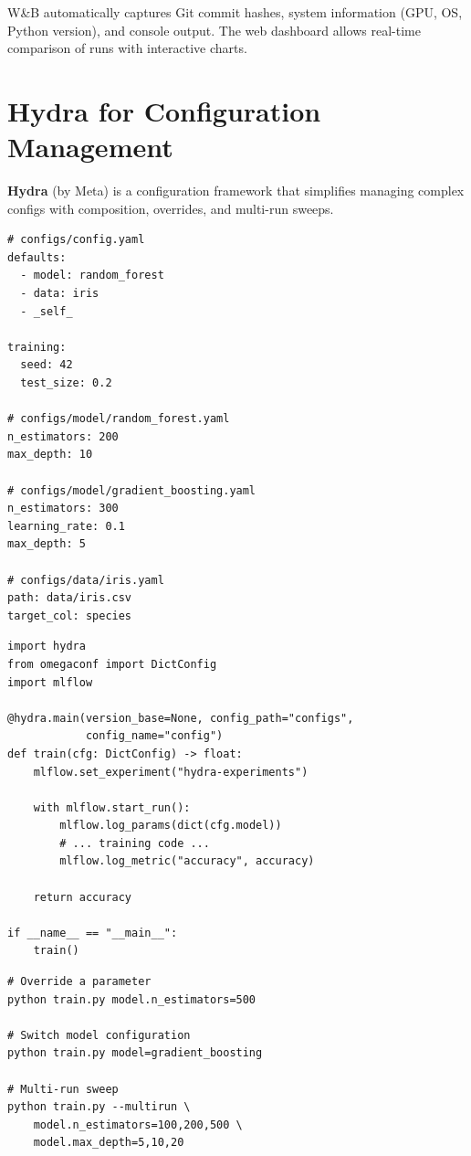 \begin{remark}
W\&B automatically captures Git commit hashes, system information (GPU,
OS, Python version), and console output. The web dashboard allows
real-time comparison of runs with interactive charts.
\end{remark}

\section{Hydra for Configuration Management}
\label{sec:hydra}

\textbf{Hydra} (by Meta) is a configuration framework that
simplifies managing complex configs with composition, overrides, and
multi-run sweeps.

\begin{codeblock}[title=\textbf{Hydra configuration example}]
\begin{verbatim}
# configs/config.yaml
defaults:
  - model: random_forest
  - data: iris
  - _self_

training:
  seed: 42
  test_size: 0.2

# configs/model/random_forest.yaml
n_estimators: 200
max_depth: 10

# configs/model/gradient_boosting.yaml
n_estimators: 300
learning_rate: 0.1
max_depth: 5

# configs/data/iris.yaml
path: data/iris.csv
target_col: species
\end{verbatim}
\end{codeblock}

\begin{codeblock}[title=\textbf{Using Hydra in Python}]
\begin{verbatim}
import hydra
from omegaconf import DictConfig
import mlflow

@hydra.main(version_base=None, config_path="configs",
            config_name="config")
def train(cfg: DictConfig) -> float:
    mlflow.set_experiment("hydra-experiments")

    with mlflow.start_run():
        mlflow.log_params(dict(cfg.model))
        # ... training code ...
        mlflow.log_metric("accuracy", accuracy)

    return accuracy

if __name__ == "__main__":
    train()
\end{verbatim}
\end{codeblock}

\begin{codeblock}[title=\textbf{Hydra command-line overrides and sweeps}]
\begin{verbatim}
# Override a parameter
python train.py model.n_estimators=500

# Switch model configuration
python train.py model=gradient_boosting

# Multi-run sweep
python train.py --multirun \
    model.n_estimators=100,200,500 \
    model.max_depth=5,10,20
\end{verbatim}
\end{codeblock}

